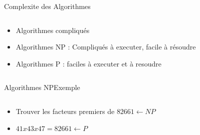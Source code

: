 \documentclass{beamer}
\begin{document}
\begin{frame}{Complexite des Algorithmes}
  \begin{columns}
    \begin{column}{0.5\textwidth}
      \begin{itemize}
      \item Algorithmes compliqu\'{e}s
        \color{red}
      \item Algorithmes NP : Compliqu\'{e}s \`a executer, facile \`a r\'esoudre
        \color{blue}
      \item Algorithmes P : faciles \`a executer et \`a resoudre
      \end{itemize}
    \end{column}
  
    \begin{column}{0.5\textwidth}
    \end{column}
  \end{columns}
\end{frame}

\begin{frame}{Algorithmes NP}{Exemple}
  \begin{columns}
    \begin{column}{0.5\textwidth}
      \begin{itemize}
      \item Trouver les facteurs premiers de $82661 \leftarrow NP$
      \item $41x43x47 = 82661 \leftarrow P$
      \end{itemize}
    \end{column}
    
    \begin{column}{0.5\textwidth}
    \end{column}
  \end{columns}
\end{frame}
\end{document}
